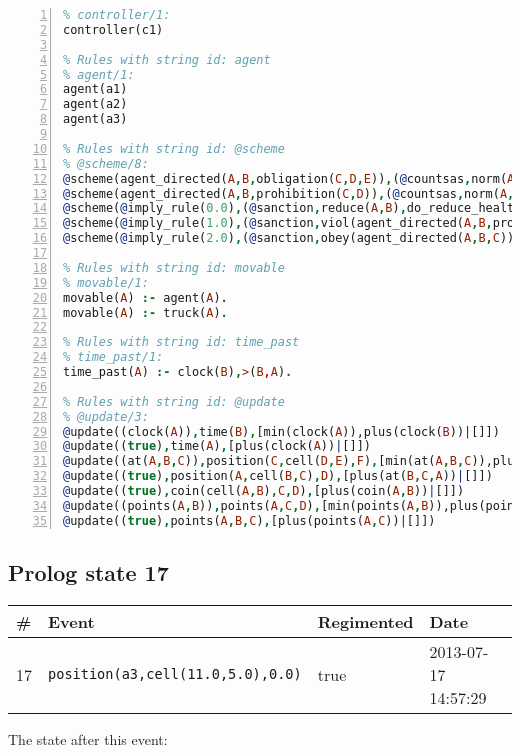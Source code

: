 \documentclass[11pt]{article}\usepackage[utf8]{inputenc}\usepackage{geometry}
\begin{document}
\begin{lstlisting}[language=Prolog, numbers=left]
% Rules with string id: controller
% controller/1:
controller(c1)

% Rules with string id: agent
% agent/1:
agent(a1)
agent(a2)
agent(a3)

% Rules with string id: @scheme
% @scheme/8:
@scheme(agent_directed(A,B,obligation(C,D,E)),(@countsas,norm(A,B,F,obligation(C,D,E)),F),false,(listTrue(C)),(time_past(D)),false,[plus(viol(agent_directed(A,B,obligation(C,D,E))))|[]],[plus(obey(agent_directed(A,B,obligation(C,D,E))))|[]])
@scheme(agent_directed(A,B,prohibition(C,D)),(@countsas,norm(A,B,E,prohibition(C,D)),E),(listTrue(C)),false,(false),false,[plus(viol(agent_directed(A,B,prohibition(C,D))))|[]],[plus(obey(agent_directed(A,B,prohibition(C,D))))|[]])
@scheme(@imply_rule(0.0),(@sanction,reduce(A,B),do_reduce_health(A,B),notifyAgent(A,changed(status))),true,false,false,false,[min(reduce(A,B))|[]],[])
@scheme(@imply_rule(1.0),(@sanction,viol(agent_directed(A,B,prohibition(C,D))),do_sanction(D)),true,false,false,false,[min(viol(agent_directed(A,B,prohibition(C,D))))|[]],[])
@scheme(@imply_rule(2.0),(@sanction,obey(agent_directed(A,B,C))),true,false,false,false,[min(obey(agent_directed(A,B,C)))|[]],[])

% Rules with string id: movable
% movable/1:
movable(A) :- agent(A).
movable(A) :- truck(A).

% Rules with string id: time_past
% time_past/1:
time_past(A) :- clock(B),>(B,A).

% Rules with string id: @update
% @update/3:
@update((clock(A)),time(B),[min(clock(A)),plus(clock(B))|[]])
@update((true),time(A),[plus(clock(A))|[]])
@update((at(A,B,C)),position(C,cell(D,E),F),[min(at(A,B,C)),plus(at(D,E,C))|[]])
@update((true),position(A,cell(B,C),D),[plus(at(B,C,A))|[]])
@update((true),coin(cell(A,B),C,D),[plus(coin(A,B))|[]])
@update((points(A,B)),points(A,C,D),[min(points(A,B)),plus(points(A,D))|[]])
@update((true),points(A,B,C),[plus(points(A,C))|[]])

\end{lstlisting}
\clearpage 
\subsection{Prolog state 17}
\begin{table}[ht]
\centering 
\begin{tabular}{l l l l} 
\textbf{\#} & \textbf{Event} & \textbf{Regimented} & \textbf{Date} \\ [0.5ex] 
\hline
17&\texttt{position(a3,cell(11.0,5.0),0.0)}&true&2013-07-17 14:57:29\\ [1ex] \hline\end{tabular}
\end{table}
The state after this event:
\end{document}
